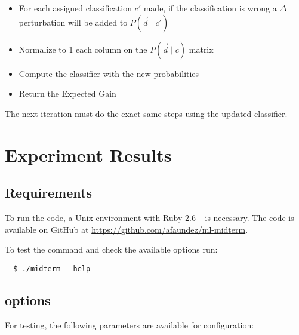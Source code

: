 \documentclass[letterpaper, conference]{IEEEtran}
\begin{document}
\begin{itemize}
  \item For each assigned classification $c'$ made, if the classification is wrong a $\Delta$ perturbation will be added to $P(\vec{d} \mid c')$
  \item Normalize to 1 each column on the $P(\vec{d} \mid c)$ matrix
  \item Compute the classifier with the new probabilities
  \item Return the Expected Gain
\end{itemize}

The next iteration must do the exact same steps using the updated classifier.

\section{Experiment Results}











\subsection{Requirements}

To run the code, a Unix environment with Ruby 2.6+ is necessary. The code is available on GitHub at \url{https://github.com/afaundez/ml-midterm}.

To test the command and check the available options run:

\begin{verbatim}
  $ ./midterm --help
\end{verbatim}

\subsection{options}

For testing, the following parameters are available for configuration:
\end{document}
